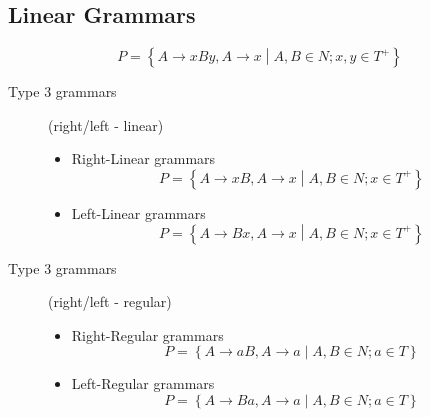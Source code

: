\subsection{Linear Grammars}
$$
	P = \left\{A \to xBy, A \to x \middle| A, B \in N; x,y \in T^+ \right\}
$$
\begin{description}
	\item[Type 3 grammars] (right/left - linear)
	\begin{itemize}
		\item Right-Linear grammars
			$$
				P = \left\{A \to xB, A \to x \middle| A, B \in N; x \in T^+ \right\}
			$$
		\item Left-Linear grammars
			$$
				P = \left\{A \to Bx, A \to x \middle| A, B \in N; x \in T^+ \right\}
			$$
	\end{itemize}
	\item[Type 3 grammars] (right/left - regular)
	\begin{itemize}
		\item Right-Regular grammars
			$$
				P = \left\{A \to aB, A \to a \middle| A, B \in N; a \in T \right\}
			$$
		\item Left-Regular grammars
			$$
				P = \left\{A \to Ba, A \to a \middle| A, B \in N; a \in T \right\}
			$$
	\end{itemize}
\end{description}
